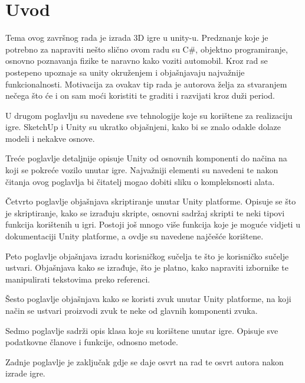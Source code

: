 \section{Uvod}
Tema ovog završnog rada je izrada 3D igre u unity-u. Predznanje koje je potrebno za napraviti nešto slično ovom radu su C\#, objektno programiranje, osnovno poznavanja fizike te naravno kako voziti automobil. Kroz rad se postepeno upoznaje sa unity okruženjem i objašnjavaju najvažnije funkcionalnosti. Motivacija za ovakav tip rada je autorova želja za stvaranjem nečega što će i on sam moći koristiti te graditi i razvijati kroz duži period.

U drugom poglavlju su navedene sve tehnologije koje su korištene za realizaciju igre. SketchUp i Unity su ukratko objašnjeni, kako bi se znalo odakle dolaze modeli i nekakve osnove.

Treće poglavlje detaljnije opisuje Unity od osnovnih komponenti do načina na koji se pokreće vozilo unutar igre. Najvažniji elementi su navedeni te nakon čitanja ovog poglavlja bi čitatelj mogao dobiti sliku o kompleksnosti alata.

Četvrto poglavlje objašnjava skriptiranje unutar Unity platforme. Opisuje se što je skriptiranje, kako se izrađuju skripte, osnovni sadržaj skripti te neki tipovi funkcija korištenih u igri. Postoji još mnogo više funkcija koje je moguće vidjeti u dokumentaciji Unity platforme, a ovdje su navedene najčešće korištene. 

Peto poglavlje objašnjava izradu korisničkog sučelja te što je korisničko sučelje ustvari. Objašnjava kako se izrađuje, što je platno, kako napraviti izbornike te manipulirati tekstovima preko referenci.

Šesto poglavlje objašnjava kako se koristi zvuk unutar Unity platforme, na koji način se ustvari proizvodi zvuk te neke od glavnih komponenti zvuka. 

Sedmo poglavlje sadrži opis klasa koje su korištene unutar igre. Opisuje sve podatkovne članove i funkcije, odnosno metode.

Zadnje poglavlje je zaključak gdje se daje osvrt na rad te osvrt autora nakon izrade igre.